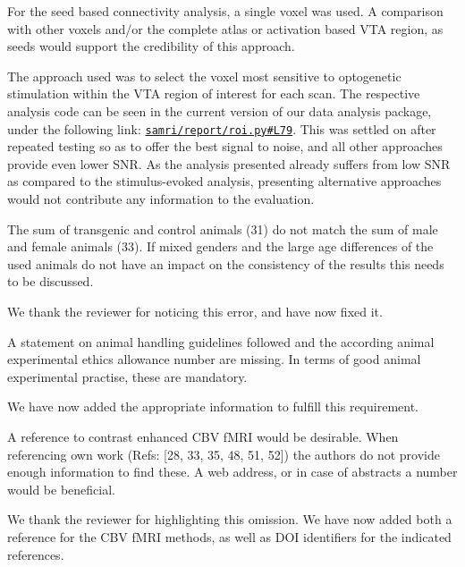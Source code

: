 \begin{point}
	For the seed based connectivity analysis, a single voxel was used. A comparison with other voxels and/or the complete atlas or activation based VTA region, as seeds would support the credibility of this approach.
\end{point}
\begin{reply}
	The approach used was to select the voxel most sensitive to optogenetic stimulation within the VTA region of interest for each scan.
	The respective analysis code can be seen in the current version of our data analysis package, under the following link: \href{https://github.com/IBT-FMI/SAMRI/blob/6e811dd96e1d545e7081dcb2ff2a57485fb7219d/samri/report/roi.py#L79}{\texttt{samri/report/roi.py\#L79}}.
	This was settled on after repeated testing so as to offer the best signal to noise, and all other approaches provide even lower SNR.
	As the analysis presented already suffers from low SNR as compared to the stimulus-evoked analysis, presenting alternative approaches would not contribute any information to the evaluation.
\end{reply}

\begin{point}
	The sum of transgenic and control animals (31) do not match the sum of male and female animals (33). If mixed genders and the large age differences of the used animals do not have an impact on the consistency of the results this needs to be discussed.
\end{point}
\begin{reply}
	We thank the reviewer for noticing this error, and have now fixed it.
\end{reply}

\begin{point}
	A statement on animal handling guidelines followed and the according animal experimental ethics allowance number are missing. In terms of good animal experimental practise, these are mandatory.
\end{point}
\begin{reply}
	We have now added the appropriate information to fulfill this requirement.
\end{reply}

\begin{point}
	A reference to contrast enhanced CBV fMRI would be desirable. When referencing own work (Refs: [28, 33, 35, 48, 51, 52]) the authors do not provide enough information to find these. A web address, or in case of abstracts a number would be beneficial.
\end{point}
\begin{reply}
	We thank the reviewer for highlighting this omission.
	We have now added both a reference for the CBV fMRI methods, as well as DOI identifiers for the indicated references.
\end{reply}

